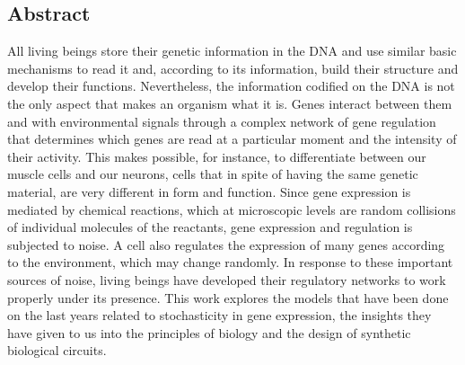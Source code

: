 \documentclass[12pt,letterpaper,twoside,openright]{report}
\begin{document}
\subsection*{Abstract}
\vspace{-0.5cm}
\begin{singlespacing}
All living beings store their genetic information in the DNA and use similar basic mechanisms to read it and, according to its information, build their structure and develop their functions. Nevertheless, the information codified on the DNA is not the only aspect that makes an organism what it is. Genes interact between them and with environmental signals through a complex network of gene regulation that determines which genes are read at a particular moment and the intensity of their activity. This makes possible, for instance, to differentiate between our muscle cells and our neurons, cells that in spite of having the same genetic material, are very different in form and function. Since gene expression is mediated by chemical reactions, which at microscopic levels are random collisions of individual molecules of the reactants, gene expression and regulation is subjected to noise. A cell also regulates the expression of many genes according to the environment, which may change randomly. In response to these important sources of noise, living beings have developed their regulatory networks to work properly under its presence. This work explores the models that have been done on the last years related to stochasticity in gene expression, the insights they have given to us into the principles of biology and the design of synthetic biological circuits.\par
\end{singlespacing}
\vspace{0.5cm}
\newpage
\tableofcontents
\newpage
\listoffigures

\raggedbottom







\nocite{*}

\printbibliography
{}
\end{document}
